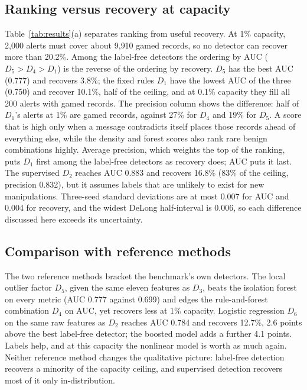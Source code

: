 \documentclass[conference]{IEEEtran}
\begin{document}
\subsection{Ranking versus recovery at capacity}
Table~\ref{tab:results}(a) separates ranking from useful recovery. At 1\%
capacity, 2,000 alerts must cover about 9{,}910 gamed records, so no
detector can recover more than 20.2\%. Among the label-free
detectors the ordering by AUC ($D_5>D_4>D_1$) is the reverse of the ordering
by recovery. $D_5$ has the best AUC (0.777) and recovers
3.8\%; the fixed rules $D_1$ have the lowest AUC of the three
(0.750) and recover 10.1\%, half of the ceiling, and at 0.1\%
capacity they fill all 200 alerts with gamed records. The precision column
shows the difference: half of $D_1$'s alerts at 1\% are gamed records,
against 27\% for $D_4$ and 19\% for $D_5$. A score
that is high only when a message contradicts itself places those records
ahead of everything else, while the density and forest scores also rank rare
benign combinations highly. Average precision, which weights the top of the
ranking, puts $D_1$ first among the label-free detectors as recovery does;
AUC puts it last. The supervised $D_2$ reaches AUC 0.883 and recovers
16.8\% (83\% of the ceiling, precision
0.832), but it assumes labels that are unlikely to exist for new
manipulations. Three-seed standard deviations are at most 0.007 for
AUC and 0.004 for recovery, and the widest DeLong half-interval is
0.006, so each difference discussed here exceeds its uncertainty.

\subsection{Comparison with reference methods}\label{sec:refmethods}
The two reference methods bracket the benchmark's own detectors. The local
outlier factor $D_5$, given the same eleven features as $D_3$, beats the
isolation forest on every metric (AUC 0.777 against 0.699) and
edges the rule-and-forest combination $D_4$ on AUC, yet recovers less at
1\% capacity. Logistic regression $D_6$ on the same raw features as $D_2$
reaches AUC 0.784 and recovers 12.7\%, 2.6
points above the best label-free detector; the boosted model adds a further
4.1 points. Labels help, and at this capacity the nonlinear
model is worth as much again. Neither reference method changes the
qualitative picture: label-free detection recovers a minority of the
capacity ceiling, and supervised detection recovers most of it only
in-distribution.
\end{document}
